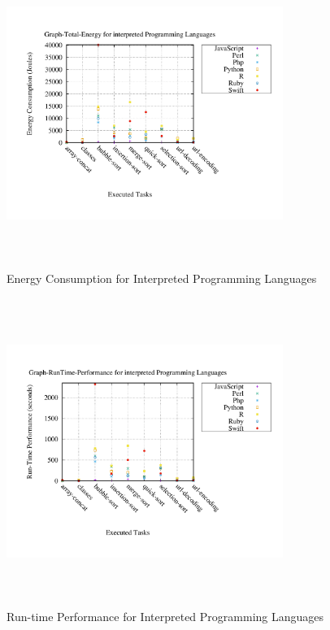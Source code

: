 \begin{figure}
	\centering
	\includegraphics[width=9cm,height=10cm,keepaspectratio]{"Graph_Graph-Total-Energy_interpreted"}
	\caption{ Energy Consumption for Interpreted Programming Languages}
	\label{Interpreted Total}
\end{figure}

\begin{figure}
	\centering
	\includegraphics[width=9cm,height=10cm,keepaspectratio]{"Graph_Graph-RunTime-Performance_interpreted"}
	\caption{Run-time Performance for Interpreted Programming Languages}
	\label{Performance Interpreted Total}
\end{figure}

